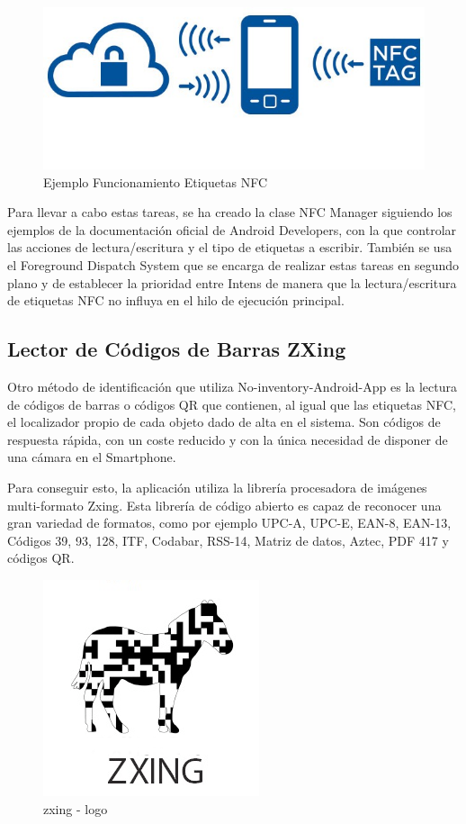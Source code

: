\documentclass[a4paper,11pt]{book}
\begin{document}
\begin{figure}[H] 
\centering 
\includegraphics[scale=0.5]{imagenes/desarrollo_herramienta/nfc.jpg}
\caption{ Ejemplo Funcionamiento Etiquetas NFC\cite{nfc4}}
\end{figure}

Para llevar a cabo estas tareas, se ha creado la clase NFC Manager siguiendo los ejemplos de la documentación oficial de Android Developers\cite{nfc2}, con la que controlar las acciones de lectura/escritura y el tipo de etiquetas a escribir. También se usa el Foreground Dispatch System\cite{nfc3} que se encarga de realizar estas tareas en segundo plano  y de establecer la prioridad entre Intens de manera que la lectura/escritura de etiquetas NFC no influya en el hilo de ejecución principal. 


 

\subsection{Lector de Códigos de Barras ZXing}

Otro método de identificación que utiliza  No-inventory-Android-App es la lectura de códigos de barras o códigos QR que contienen, al igual que las etiquetas NFC, el localizador propio de cada objeto dado de alta en el sistema. Son códigos de respuesta rápida, con un coste reducido y con la única necesidad de disponer de una cámara en el Smartphone. 

Para conseguir esto, la aplicación utiliza la librería procesadora de imágenes multi-formato Zxing\cite{cebra}. Esta librería de código abierto  es capaz de reconocer una gran variedad de formatos, como por ejemplo  UPC-A, UPC-E, EAN-8, EAN-13, Códigos 39, 93, 128, ITF, Codabar, RSS-14, Matriz de datos, Aztec, PDF 417 y códigos QR. 

\begin{figure}[H] 
\centering 
\includegraphics[scale=0.5]{imagenes/desarrollo_herramienta/zxing.png}
\caption{ zxing - logo\cite{cebra3}}
\end{figure}
\end{document}
